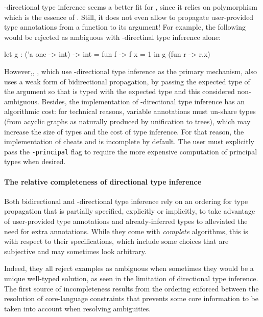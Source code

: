 \documentclass[acmsmall,screen,nonacm]{acmart}
\begin{document}
\Geninst-directional type inference seems a better fit for \ML, since it relies
on polymorphism which is the essence of \ML. Still, it does not even allow
to propagate user-provided type annotations from a function to its argument!
For example, the following would be rejected as ambiguous with
\geninst-directinal type inference alone:
\begin{program}[error]
let g : ('a one -> int) -> int = fun f -> f {x = 1} in g (fun r -> r.x)
\end{program}
However,, \OCaml, which use \geninst-directional type inference as the primary
mechanism, also uses a weak form of bidirectional propagation,
by passing the expected type of the argument so that
 is typed with the expected type
 and this considered non-ambiguous.
%
Besides, the implementation of \geninst-directional type inference has an
algorithmic cost: for technical reasons, variable annotations must un-share
types (from acyclic graphs as naturally produced by unification to trees),
which may increase the size of types and the cost of type inference. For
that reason, the implementation of \OCaml cheats and is incomplete by
default. The user must explicitly pass the \texttt{-principal} flag to
require the more expensive computation of principal types when desired.

\paragraph{The relative completeness of directional type inference}

Both bidirectional and \geninst-directional type inference rely on an
ordering for type propagation that is partially specified, explicitly or
implicitly, to take advantage of user-provided type annotations and
already-inferred types to alleviated the need for extra annotations.
%
While they come with \emph{complete} algorithms, this is with respect to
their specifications, which include some choices that are subjective and may
sometimes look arbitrary.

Indeed, they all reject examples as ambiguous when sometimes they would be a
unique well-typed solution, as seen in the limitation of directional type
inference.  The first source of incompleteness results from the ordering
enforced between the resolution of core-language constraints that prevents
some core information to be taken into account when resolving ambiguities.
\end{document}
